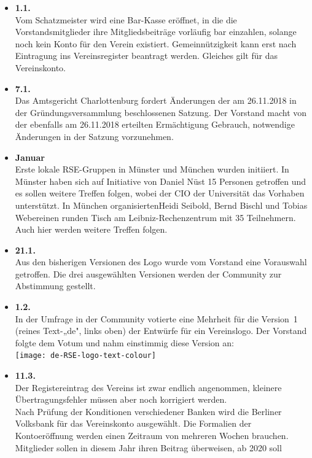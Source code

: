 \begin{itemize}
 \item \textbf{1.1.}\\
  Vom Schatzmeister wird eine Bar-Kasse eröffnet, in die die
  Vorstandsmitglieder ihre Mitgliedsbeiträge vorläufig bar einzahlen,
  solange noch kein Konto für den Verein existiert.
  Gemeinnützigkeit kann erst nach Eintragung ins Vereinsregister beantragt
  werden. Gleiches gilt für das Vereinskonto.
 \item \textbf{7.1.}\\
  Das Amtsgericht Charlottenburg fordert Änderungen der am 26.11.2018 in der
  Gründungsversammlung beschlossenen Satzung. Der
  Vorstand macht von der ebenfalls am 26.11.2018 erteilten Ermächtigung
  Gebrauch, notwendige Änderungen in der Satzung vorzunehmen.
 \item \textbf{Januar}\\
  Erste lokale RSE-Gruppen in Münster und München wurden initiiert. In Münster haben sich auf Initiative von Daniel Nüst 15 Personen getroffen und es sollen weitere
  Treffen folgen, wobei der CIO der Universität das Vorhaben unterstützt.
  In München organisiertenHeidi Seibold, Bernd Bischl und Tobias Webereinen runden Tisch am Leibniz-Rechenzentrum mit 35 Teilnehmern. Auch hier werden weitere Treffen folgen.
 \item \textbf{21.1.}\\
  Aus den bisherigen Versionen des Logo wurde vom Vorstand eine Vorauswahl
  getroffen. Die drei ausgewählten Versionen werden der Community zur
  Abstimmung gestellt.
 \item \textbf{1.2.}\\
  In der Umfrage in der Community votierte eine Mehrheit
  für die Version~1 (reines Text-„de", links oben) der Entwürfe für ein Vereinslogo.
  Der Vorstand folgte dem Votum und nahm einstimmig diese Version an:\\
  \texttt{[image: de-RSE-logo-text-colour]}
 \item \textbf{11.3.}\\
  Der Registereintrag des Vereins ist zwar endlich angenommen, kleinere Übertragungsfehler
  müssen aber noch korrigiert werden.\\
  Nach Prüfung der Konditionen verschiedener Banken wird die Berliner
  Volksbank für das Vereinskonto ausgewählt. Die Formalien der Kontoeröffnung werden
  einen Zeitraum von mehreren Wochen brauchen.\\
  Mitglieder sollen in diesem Jahr ihren Beitrag überweisen, ab 2020 soll

\end{itemize}
